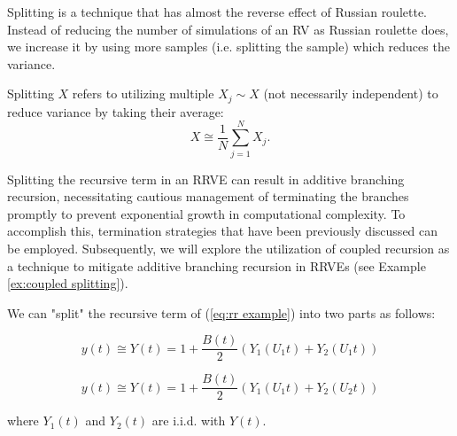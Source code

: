\documentclass[a4paper,12pt]{article}
\begin{document}



Splitting is a technique that has almost the reverse effect of Russian roulette.
Instead of reducing the number of simulations of an RV as Russian roulette does,
we increase it by using more samples (i.e. splitting the sample) which
reduces the variance.

\begin{definition}[splitting] \label{def:splitting}
  Splitting $X$ refers to utilizing multiple $X_{j} \sim X$ (not necessarily independent) to
  reduce variance by taking their average:
  \begin{equation}
    X \cong \frac{1}{N} \sum_{j=1}^{N} X_{j}.
  \end{equation}
\end{definition}

Splitting the recursive term in an RRVE can result in additive branching recursion,
necessitating cautious management of terminating the branches promptly to prevent
exponential growth in computational complexity. To accomplish this, termination
strategies that have been previously discussed can be employed. Subsequently,
we will explore the utilization of coupled recursion as a technique to mitigate
additive branching recursion in RRVEs (see Example \ref{ex:coupled splitting}).

\begin{example} \label{ex:splitting}
  We can "split" the recursive term of (\ref{eq:rr example})
  into two parts as follows:

  \begin{equation}\label{eq:splitting}
    y(t) \cong Y(t) =1 + \frac{B(t)}{2}(Y_{1}(U_{1}t) + Y_{2}(U_{1}t))
  \end{equation}


  \begin{equation}\label{eq:splitting2}
    y(t) \cong Y(t) =1 + \frac{B(t)}{2}(Y_{1}(U_{1}t) + Y_{2}(U_{2}t))
  \end{equation}


  where $Y_{1}(t)$ and $Y_{2}(t)$ are i.i.d. with $Y(t)$.
\end{example}
\end{document}
